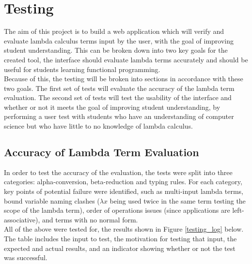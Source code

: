 \documentclass[a4paper,11pt]{report}
\begin{document}
\chapter{Testing}
The aim of this project is to build a web application which will verify and evaluate lambda calculus terms input by the user, with the goal of improving student understanding. This can be broken down into two key goals for the created tool, the interface should evaluate lambda terms accurately and should be useful for students learning functional programming.\\

Because of this, the testing will be broken into sections in accordance with these two goals. The first set of tests will evaluate the accuracy of the lambda term evaluation. The second set of tests will test the usability of the interface and whether or not it meets the goal of improving student understanding, by performing a user test with students who have an understanding of computer science but who have little to no knowledge of lambda calculus.

\section{Accuracy of Lambda Term Evaluation}
\label{Accuracy of Lambda Term Evaluation}
In order to test the accuracy of the evaluation, the tests were split into three categories: alpha-conversion, beta-reduction and typing rules. For each category, key points of potential failure were identified, such as multi-input lambda terms, bound variable naming clashes ($\lambda x$ being used twice in the same term testing the scope of the lambda term), order of operations issues (since applications are left-associative), and terms with no normal form.\\

All of the above were tested for, the results shown in Figure \ref{testing_log} below. The table includes the input to test, the motivation for testing that input, the expected and actual results, and an indicator showing whether or not the test was successful.\\
\end{document}
